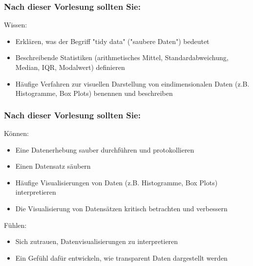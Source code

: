 \documentclass{beamer}
\begin{document}
\begin{frame}

\frametitle{Nach dieser Vorlesung sollten Sie:}



\begin{block}{Wissen:}

\begin{itemize}
\item
Erklären, was der Begriff "tidy data" ("saubere Daten") bedeutet
\item 
Beschreibende Statistiken (arithmetisches Mittel, Standardabweichung, Median, IQR, Modalwert) definieren
\item 
Häufige Verfahren zur visuellen Darstellung von eindimensionalen Daten (z.B. Histogramme, Box Plots) benennen und beschreiben 
\end{itemize}

\end{block}

 


\end{frame}

\begin{frame}

\frametitle{Nach dieser Vorlesung sollten Sie:}


\begin{block}{Können:}
\begin{itemize}
\item
Eine Datenerhebung sauber durchführen und protokollieren
\item 
Einen Datensatz säubern
\item
Häufige Visualisierungen von Daten (z.B. Histogramme, Box Plots) interpretieren
\item
Die Visualisierung von Datensätzen kritisch betrachten und verbessern
\end{itemize}
\end{block}

\begin{block}{Fühlen:}

\begin{itemize}
\item
Sich zutrauen, Datenvisualisierungen zu interpretieren
\item 
Ein Gefühl dafür entwickeln, wie transparent Daten dargestellt werden
\end{itemize}

\end{block}


\end{frame}
\end{document}

